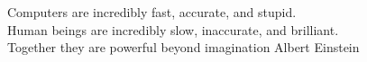 \thispagestyle{empty}
\begin{flushright}

\vspace*{60mm}

Computers are incredibly fast, accurate, and stupid.\\
Human beings are incredibly slow, inaccurate, and brilliant.\\
Together they are powerful beyond imagination
\vspace{4mm}
Albert Einstein \textit{}\\

\end{flushright}